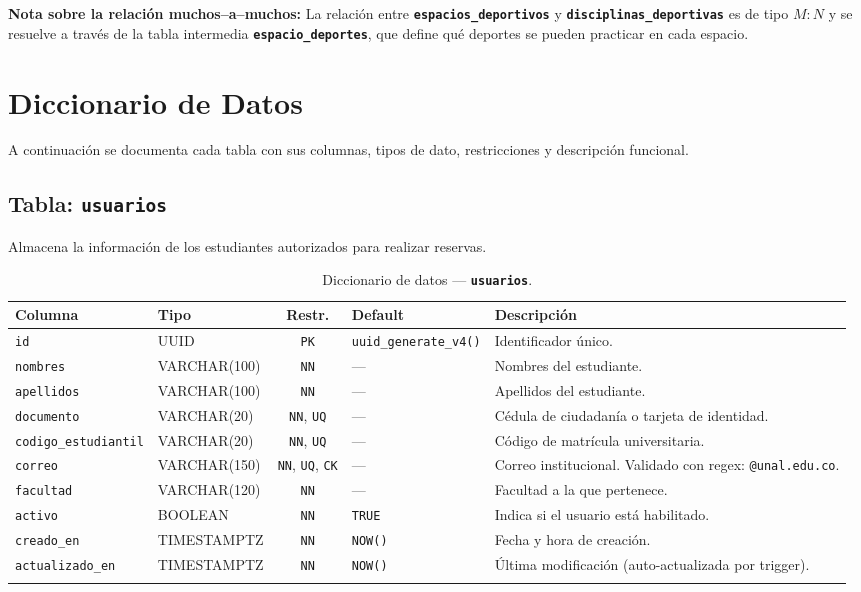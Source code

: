 \documentclass[12pt, a4paper]{article}
\newcommand{\pk}{\texttt{PK}}
\newcommand{\uq}{\texttt{UQ}}
\newcommand{\nn}{\texttt{NN}}
\newcommand{\chk}{\texttt{CK}}
\newcommand{\tname}[1]{\texttt{\textbf{#1}}}
\newcommand{\cname}[1]{\texttt{#1}}
\begin{document}
\textbf{Nota sobre la relación muchos--a--muchos:} La relación entre \tname{espacios\_deportivos} y \tname{disciplinas\_deportivas} es de tipo $M:N$ y se resuelve a través de la tabla intermedia \tname{espacio\_deportes}, que define qué deportes se pueden practicar en cada espacio.


\section{Diccionario de Datos}

A continuación se documenta cada tabla con sus columnas, tipos de dato, restricciones y descripción funcional.

\subsection{Tabla: \tname{usuarios}}

Almacena la información de los estudiantes autorizados para realizar reservas.

\begin{longtable}{l l c l p{5cm}}
    \toprule
    \textbf{Columna} & \textbf{Tipo} & \textbf{Restr.} & \textbf{Default} & \textbf{Descripción} \\
    \midrule
    \endhead
    \cname{id} & UUID & \pk & \texttt{uuid\_generate\_v4()} & Identificador único. \\
    \cname{nombres} & VARCHAR(100) & \nn & --- & Nombres del estudiante. \\
    \cname{apellidos} & VARCHAR(100) & \nn & --- & Apellidos del estudiante. \\
    \cname{documento} & VARCHAR(20) & \nn, \uq & --- & Cédula de ciudadanía o tarjeta de identidad. \\
    \cname{codigo\_estudiantil} & VARCHAR(20) & \nn, \uq & --- & Código de matrícula universitaria. \\
    \cname{correo} & VARCHAR(150) & \nn, \uq, \chk & --- & Correo institucional. Validado con regex: \texttt{@unal.edu.co}. \\
    \cname{facultad} & VARCHAR(120) & \nn & --- & Facultad a la que pertenece. \\
    \cname{activo} & BOOLEAN & \nn & \texttt{TRUE} & Indica si el usuario está habilitado. \\
    \cname{creado\_en} & TIMESTAMPTZ & \nn & \texttt{NOW()} & Fecha y hora de creación. \\
    \cname{actualizado\_en} & TIMESTAMPTZ & \nn & \texttt{NOW()} & Última modificación (auto-actualizada por trigger). \\
    \bottomrule
    \caption{Diccionario de datos --- \tname{usuarios}.}
\end{longtable}
\end{document}
